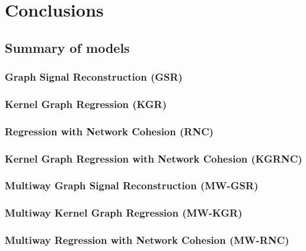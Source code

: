 \chapter{Conclusions} %

\label{chap:conclusions} %



\section{Summary of models}

\subsection{Graph Signal Reconstruction (GSR)}

\subsection{Kernel Graph Regression (KGR)}

\subsection{Regression with Network Cohesion (RNC)}

\subsection{Kernel Graph Regression with Network Cohesion (KGRNC)}

\subsection{Multiway Graph Signal Reconstruction (MW-GSR)}

\subsection{Multiway Kernel Graph Regression (MW-KGR)}

\subsection{Multiway Regression with Network Cohesion (MW-RNC)}

